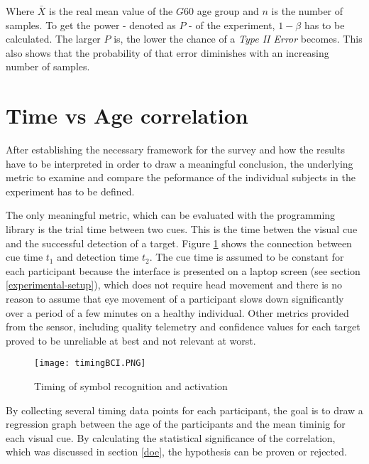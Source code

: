             Where $\bar{X}$ is the real mean value of the $G60$ age group and $n$ is the number of samples. To get the power - denoted as $P$ - of the experiment, $1-\beta$ has to be calculated. The larger $P$ is, the lower the chance of a \textit{Type II Error} becomes. This also shows that the probability of that error diminishes with an increasing number of samples.
                 
        \section{Time vs Age correlation}\label{correlation}

            After establishing the necessary framework for the survey and how the results have to be interpreted in order to draw a meaningful conclusion, the underlying metric to examine and compare the peformance of the individual subjects in the experiment has to be defined. 

            The only meaningful metric, which can be evaluated with the programming library is the trial time between two cues. This is the time betwen the visual cue and the successful detection of a target. Figure \ref*{itr-timing} shows the connection between cue time $t_{1}$ and detection time $t_{2}$. The cue time is assumed to be constant for each participant because the interface is presented on a laptop screen (see section \ref*{experimental-setup}), which does not require head movement and there is no reason to assume that eye movement of a participant slows down significantly over a period of a few minutes on a healthy individual. Other metrics provided from the sensor, including quality telemetry and confidence values for each target proved to be unreliable at best and not relevant at worst.

            \begin{figure}[h]     %
                \centering
                \texttt{[image: timingBCI.PNG]} 
                \caption{Timing of symbol recognition and activation}\label{itr-timing}
            \end{figure}

            By collecting several timing data points for each participant, the goal is to draw a regression graph between the age of the participants and the mean timinig for each visual cue. By calculating the statistical significance of the correlation, which was discussed in section \ref*{doe}, the hypothesis can be proven or rejected.

